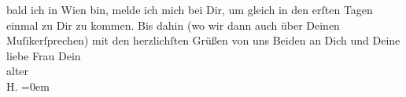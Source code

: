\begin{ledgroupsized}[t]{13cm}
               bald ich in Wien bin, melde ich mich bei Dir, um
               gleich in den erſten Tagen einmal zu Dir zu kommen. Bis dahin (wo wir dann auch über
               Deinen Muſikerſprechen) mit den herzlichſten Grüßen von uns Beiden an Dich und Deine
               liebe Frau\pend
           \pstart
           Dein{\\[\baselineskip]}alter{\\[\baselineskip]}\spacefill\mbox{H.}\pend
           \leftskip=0em{}
         
         \endnumbering{}\end{ledgroupsized}  \newcommand{\dateiname}{L02300}\newcommand{\titel}{Hermann Bahr an Arthur Schnitzler, 25. 8. 1918}\newcommand{\editorInnen}{ Kurt Ifkovits,  Martin Anton Müller}
      